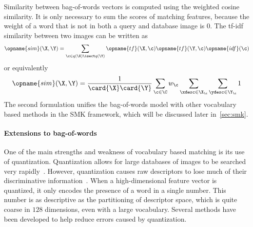             Similarity between bag-of-words vectors is computed using the weighted cosine similarity. It is only
            necessary to sum the scores of matching features, because the weight of a word that is not in both a query
            and database image is $0$.
            The tf-idf similarity between two images can be written as
            \begin{equation}
                \opname{sim}(\X, \Y) = \sum_{\c \in q(\X) \isect q(\Y)} \opname{tf}(\X, \c) \opname{tf}(\Y, \c) \opname{idf}(\c) 
            \end{equation}
            or equivalently
            \begin{equation}
                \opname{sim}(\X, \Y) = \frac{1}{\card{\X}\card{\Y}}\sum_{\c \in \C} w_\c \sum_{\xdesc \in \X_\c} \sum_{\ydesc \in \Y_\c} 1
            \end{equation}
            The second formulation unifies the bag-of-words model with other vocabulary based methods in the SMK
            framework, which will be discussed later in~\cref{sec:smk}.

        \paragraph{Extensions to bag-of-words}
            One of the main strengths and weakness of vocabulary based matching is its use of quantization. Quantization
            allows for large databases of images to be searched very rapidly~\cite{nister_scalable_2006}. However,
            quantization causes raw descriptors to lose much of their discriminative
            information~\cite{philbin_lost_2008, boiman_defense_2008}. When a high-dimensional feature vector is
            quantized, it only encodes the presence of a word in a single number. This number is as descriptive as the
            partitioning of descriptor space, which is quite coarse in $128$ dimensions, even with a large vocabulary.
            Several methods have been developed to help reduce errors caused by quantization.

